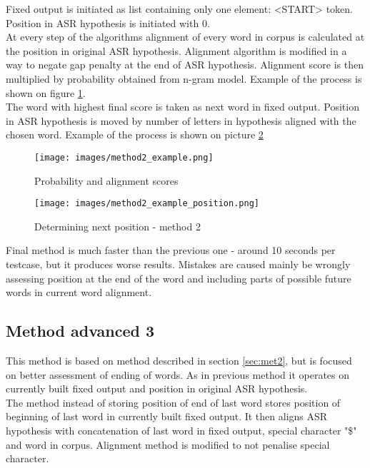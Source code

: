 \documentclass[a4paper,11pt,twoside]{report}
\theoremstyle{definition}
\begin{document}
Fixed output is initiated as list containing only one element: <START> token. Position in ASR hypothesis is initiated with 0. \\
At every step of the algorithms alignment of every word in corpus is calculated at the position in original ASR hypothesis. Alignment algorithm is modified in a way to negate gap penalty at the end of ASR hypothesis. Alignment score is then multiplied by probability obtained from n-gram model. Example of the process is shown on figure \ref{img:method2example}.\\
The word with highest final score is taken as next word in fixed output. Position in ASR hypothesis is moved by number of letters in hypothesis aligned with the chosen word. Example of the process is shown on picture \ref{img:method2example2}

\begin{figure}[H]{}
    \centering
    \texttt{[image: images/method2\_example.png]}
    \caption{Probability and alignment scores}
    \label{img:method2example}
\end{figure}

\begin{figure}[H]{}
    \centering
    \texttt{[image: images/method2\_example\_position.png]}
    \caption{Determining next position - method 2}
    \label{img:method2example2}
\end{figure}

Final method is much faster than the previous one - around 10 seconds per testcase, but it produces worse results. Mistakes are caused mainly be wrongly assessing position at the end of the word and including parts of possible future words in current word alignment.

\subsection{Method advanced 3}

This method is based on method described in section \ref{sec:met2}, but is focused on better assessment of ending of words. As in previous method it operates on currently built fixed output and position in original ASR hypothesis. \\

The method instead of storing position of end of last word stores position of beginning of last word in currently built fixed output. It then aligns ASR hypothesis with concatenation of last word in fixed output, special character "\$" and word in corpus. Alignment method is modified to not penalise special character.\\
\end{document}
